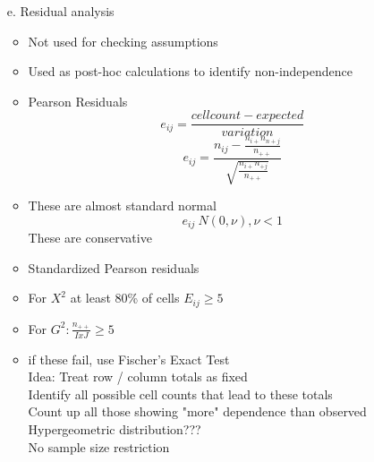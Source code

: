 \documentclass[12 pt]{article}
\begin{document}
\begin{itemize}
\begin{itemize}
        \item [e.] Residual analysis
            \begin{itemize}
                \item Not used for checking assumptions
                \item Used as post-hoc calculations to identify non-independence
                \item Pearson Residuals
                $$e_{ij} = \frac{cell count - expected}{variation} $$ 
                $$e_{ij} = \frac{n_{ij}-\frac{n_{i+}n_{n+j}}{n_{++}}}{\sqrt{\frac{n_{i+}n_{+j}}{n_{++}}}} $$
                \item These are almost standard normal
                $$e_{ij}~ N(0, \nu)  , \nu < 1$$
                These are conservative
                \item Standardized Pearson residuals
                \item For \( X^2 \) at least 80\% of cells \( E_{ij} \geq 5\)
                \item For \(G^2:  \frac{n_{++}}{IxJ}\geq 5\)
                \item if these fail, use Fischer's Exact Test\\
                Idea: Treat row / column totals as fixed \\
                Identify all possible cell counts that lead to these totals\\
                Count up all those showing "more" dependence than observed\\
                Hypergeometric distribution???\\
                No sample size restriction
            \end{itemize}
       

\end{itemize}
\end{itemize}
\end{document}
